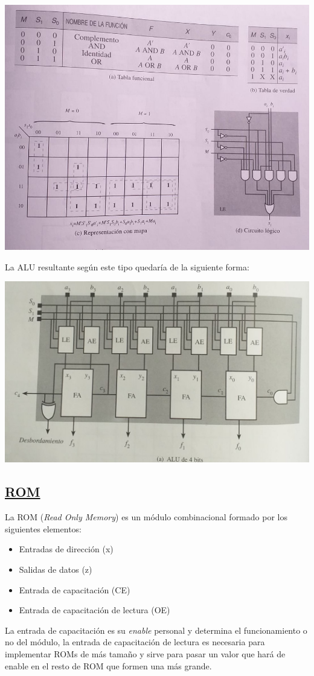 \documentclass[a4paper,10pt]{book}
\begin{document}
\begin{center}
\includegraphics[scale=0.35]{Ampliador_logico}
\end{center}

La ALU resultante según este tipo quedaría de la siguiente forma:
\begin{center}
\includegraphics[scale=0.37]{ALU_final}
\end{center}

\subsection*{\underline{ROM}}
La ROM (\textit{Read Only Memory}) es un módulo combinacional formado por los siguientes elementos:
\begin{itemize}
\item Entradas de dirección (x)
\item Salidas de datos (z)
\item Entrada de capacitación (CE)
\item Entrada de capacitación de lectura (OE)
\end{itemize}
La entrada de capacitación es su \textit{enable} personal y determina el funcionamiento o no del módulo, la entrada de capacitación de lectura	es necesaria para implementar ROMs de más tamaño y sirve para pasar un valor que hará de enable en el resto de ROM que formen una más grande.
\end{document}

